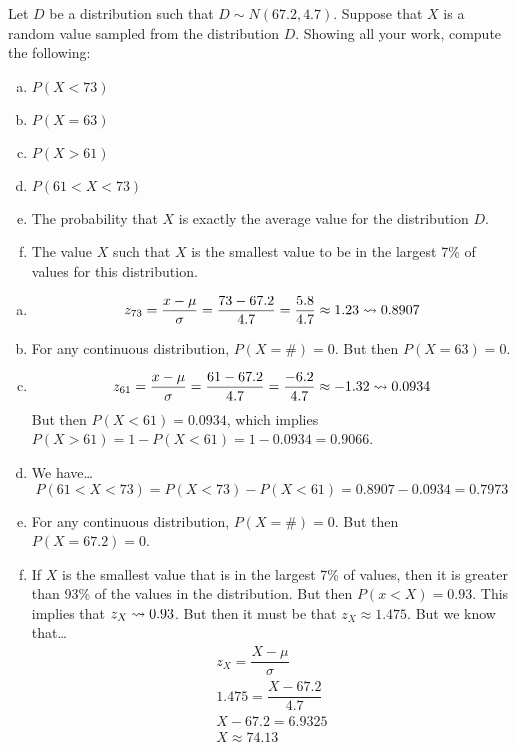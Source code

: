\documentclass[11pt,letterpaper]{article}
\begin{document}
 Let $D$ be a distribution such that $D \sim N(67.2, 4.7)$. Suppose that $X$ is a random value sampled from the distribution $D$. Showing all your work, compute the following:
	\begin{enumerate}[(a)]
	\item $P(X < 73)$
	\item $P(X= 63)$
	\item $P(X > 61)$
	\item $P(61 < X < 73)$
	\item The probability that $X$ is exactly the average value for the distribution $D$. 
	\item The value $X$ such that $X$ is the smallest value to be in the largest 7\% of values for this distribution. 
	\end{enumerate} \pspace

\sol 
\begin{enumerate}[(a)]
\item
	\[
	z_{73}= \dfrac{x - \mu}{\sigma}= \dfrac{73 - 67.2}{4.7}= \dfrac{5.8}{4.7} \approx 1.23 \rightsquigarrow 0.8907
	\] \pspace

\item For any continuous distribution, $P(X= \#)= 0$. But then $P(X= 63)= 0$. \pspace

\item 
	\[
	z_{61}= \dfrac{x - \mu}{\sigma}= \dfrac{61 - 67.2}{4.7}= \dfrac{-6.2}{4.7} \approx -1.32 \rightsquigarrow 0.0934
	\] 
But then $P(X < 61)= 0.0934$, which implies $P(X > 61)= 1 - P(X < 61)= 1 - 0.0934= 0.9066$. \pspace

\item We have\dots
	\[
	P(61 < X < 73)= P(X < 73) - P(X < 61)= 0.8907 - 0.0934= 0.7973
	\] \pspace

\item For any continuous distribution, $P(X= \#)= 0$. But then $P(X= 67.2)= 0$. \pspace

\item If $X$ is the smallest value that is in the largest 7\% of values, then it is greater than 93\% of the values in the distribution. But then $P(x < X)= 0.93$. This implies that $z_X \rightsquigarrow 0.93$. But then it must be that $z_X \approx 1.475$. But we know that\dots
	\[
	\begin{gathered}
	z_X= \dfrac{X - \mu}{\sigma} \\
	1.475= \dfrac{X - 67.2}{4.7} \\
	X - 67.2= 6.9325 \\
	X \approx 74.13
	\end{gathered}
	\]


\end{enumerate}
\end{document}
